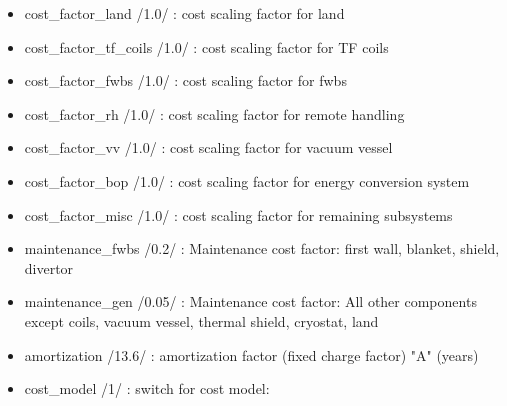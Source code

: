 \documentclass[]{article}
\begin{document}
\begin{itemize}
\item
  cost\_factor\_land /1.0/ : cost scaling factor for land
\item
  cost\_factor\_tf\_coils /1.0/ : cost scaling factor for TF coils
\item
  cost\_factor\_fwbs /1.0/ : cost scaling factor for fwbs
\item
  cost\_factor\_rh /1.0/ : cost scaling factor for remote handling
\item
  cost\_factor\_vv /1.0/ : cost scaling factor for vacuum vessel
\item
  cost\_factor\_bop /1.0/ : cost scaling factor for energy conversion
  system
\item
  cost\_factor\_misc /1.0/ : cost scaling factor for remaining
  subsystems
\item
  maintenance\_fwbs /0.2/ : Maintenance cost factor: first wall,
  blanket, shield, divertor
\item
  maintenance\_gen /0.05/ : Maintenance cost factor: All other
  components except coils, vacuum vessel, thermal shield, cryostat, land
\item
  amortization /13.6/ : amortization factor (fixed charge factor) "A"
  (years)
\item
  cost\_model /1/ : switch for cost model:


\end{itemize}
\end{document}
